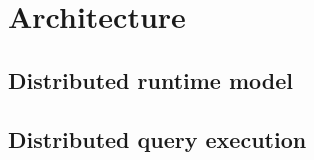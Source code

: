
\chapter{Architecture}

\section{Distributed runtime model}

\section{Distributed query execution}


